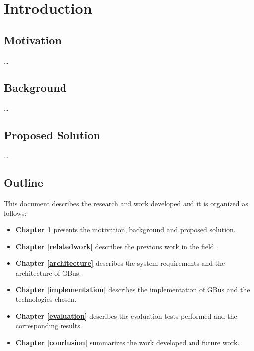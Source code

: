 \chapter{Introduction}\label{introduction}

\section{Motivation}

\ldots

\section{Background}

\ldots

\section{Proposed Solution}

\ldots

\section{Outline}

This document describes the research and work developed and it is organized as follows:

\begin{itemize}
\item \textbf{Chapter \ref{introduction}} presents the motivation, background and proposed solution.
\item \textbf{Chapter \ref{relatedwork}} describes the previous work in the field.
\item \textbf{Chapter \ref{architecture}} describes the system requirements and the architecture of GBus.
\item \textbf{Chapter \ref{implementation}} describes the implementation of GBus and the technologies chosen.
\item \textbf{Chapter \ref{evaluation}} describes the evaluation tests performed and the corresponding results.
\item \textbf{Chapter \ref{conclusion}} summarizes the work developed and future work.
\end{itemize}

